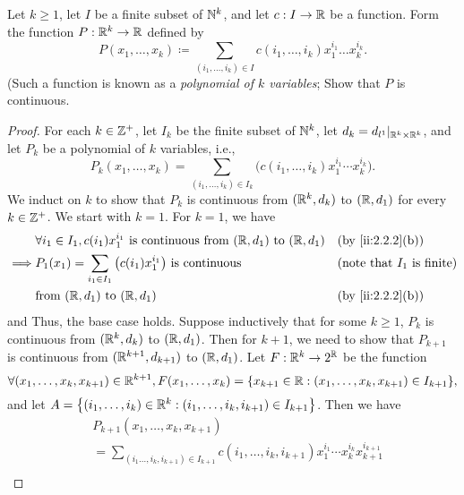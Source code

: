 \begin{ex}\label{ii:ex:2.2.7}
  Let \(k \geq 1\), let \(I\) be a finite subset of \(\mathbb{N}^k\), and let \(c : I \to \mathbb{R}\) be a function.
  Form the function \(P : \mathbb{R}^k \to \mathbb{R}\) defined by
  \[
    P(x_1, \dots, x_k) \coloneqq \sum_{(i_1, \dots, i_k) \in I} c(i_1, \dots, i_k) x_1^{i_1} \dots x_k^{i_k}.
  \]
  (Such a function is known as a \emph{polynomial of \(k\) variables};
  Show that \(P\) is continuous.
\end{ex}

\begin{proof}
  For each \(k \in \mathbb{Z}^+\), let \(I_k\) be the finite subset of \(\mathbb{N}^k\), let \(d_k = d_{l^1}|_{\mathbb{R}^k \times \mathbb{R}^k}\), and let \(P_k\) be a polynomial of \(k\) variables, i.e.,
  \[
    P_k(x_1, \dots, x_k) = \sum_{(i_1, \dots, i_k) \in I_k} \big(c(i_1, \dots, i_k) x_1^{i_1} \cdots x_k^{i_k}\big).
  \]
  We induct on \(k\) to show that \(P_k\) is continuous from \((\mathbb{R}^k, d_k)\) to \((\mathbb{R}, d_1)\) for every \(k \in \mathbb{Z}^+\).
  We start with \(k = 1\).
  For \(k = 1\), we have
  \begin{align*}
             & \forall i_1 \in I_1, c(i_1) x_1^{i_1} \text{ is continuous from } (\R, d_1) \text{ to } (\R, d_1) &  & \by{ii:2.2.2}[b]                     \\
    \implies & P_1(x_1) = \sum_{i_1 \in I_1} \big(c(i_1) x_1^{i_1}\big) \text{ is continuous}                    &  & \text{(note that \(I_1\) is finite)} \\
             & \text{from } (\R, d_1) \text{ to } (\R, d_1)                                                      &  & \by{ii:2.2.2}[b]
  \end{align*}
  and Thus, the base case holds.
  Suppose inductively that for some \(k \geq 1\), \(P_k\) is continuous from \((\mathbb{R}^k, d_k)\) to \((\mathbb{R}, d_1)\).
  Then for \(k + 1\), we need to show that \(P_{k + 1}\) is continuous from \((\mathbb{R}^{k + 1}, d_{k + 1})\) to \((\mathbb{R}, d_1)\).
  Let \(F : \mathbb{R}^k \to 2^{\mathbb{R}}\) be the function
  \[
    \forall (x_1, \dots, x_k, x_{k + 1}) \in \R^{k + 1}, F(x_1, \dots, x_k) = \set{x_{k + 1} \in \R : (x_1, \dots, x_k, x_{k + 1}) \in I_{k + 1}},
  \]
  and let \(A = \left\lbrace(i_1, \dots, i_k) \in \mathbb{R}^k : (i_1, \dots, i_k, i_{k + 1}) \in I_{k + 1}\right\rbrace\).
  Then we have
  \begin{align*}
     & P_{k + 1}(x_1, \dots, x_k, x_{k + 1})                                                                                                                                                                        \\
     & = \sum_{(i_1 \dots, i_k, i_{k + 1}) \in I_{k + 1}} c(i_1, \dots, i_k, i_{k + 1}) x_1^{i_1} \cdots x_k^{i_k} x_{k + 1}^{i_{k + 1}}                                                                            \\

\end{align*}
\end{proof}
